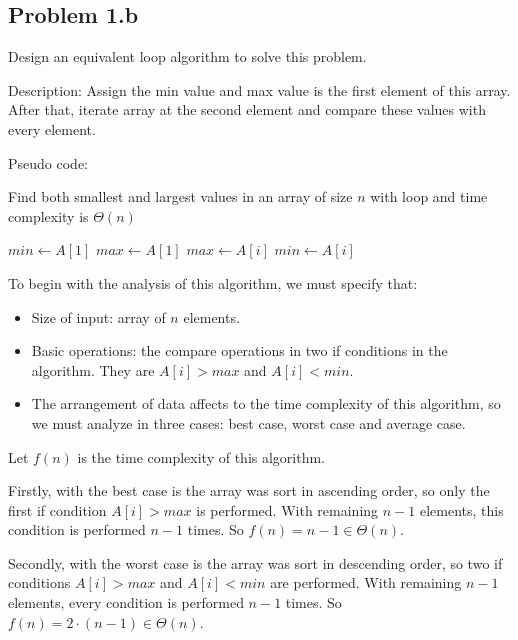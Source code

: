 \documentclass[a4paper]{article}
\begin{document}
\subsection{Problem 1.b}
Design an equivalent loop algorithm to solve this problem. \par \bigskip
Description: Assign the min value and max value is the first element of this array. After that, iterate array at the second element and compare these values with every element. \par \bigskip
Pseudo code: \par 
\begin{algorithm}
\renewcommand{\thealgorithm}{}
\caption{Find both smallest and largest values in an array of size $n$ with loop and time complexity is $\Theta(n)$}
\begin{algorithmic}

    \State $min \gets A[1]$
    \State $max \gets A[1]$
        \State $max \gets A[i]$ 
        \Else
            \State $min \gets A[i]$ 
            \EndIf
        \EndIf
    \EndFor
    \State {}
\EndProcedure

\end{algorithmic}
\end{algorithm}
To begin with the analysis of this algorithm, we must specify that: \par
\begin{itemize}
    \item Size of input: array of $n$ elements.
    \item Basic operations: the compare operations in two if conditions in the algorithm. They are $A[i] > max$ and $A[i] < min$.
    \item The arrangement of data affects to the time complexity of this algorithm, so we must analyze in three cases: best case, worst case and average case.
\end{itemize}
Let $f(n)$ is the time complexity of this algorithm. \par \bigskip
Firstly, with the best case is the array was sort in ascending order, so only the first if condition $A[i] > max$ is performed. With remaining $n-1$ elements, this condition is performed $n-1$ times. So $f(n) = n-1 \in \Theta(n)$. \par \bigskip
Secondly, with the worst case is the array was sort in descending order, so two if conditions $A[i] > max$ and $A[i] < min$ are performed. With remaining $n-1$ elements, every condition is performed $n-1$ times. So $f(n) = 2 \cdot (n-1) \in \Theta(n)$. \par \bigskip
\end{document}
